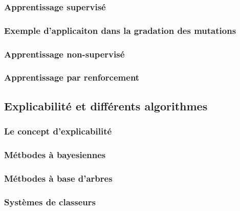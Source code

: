 \subsubsection{Apprentissage supervisé}
\subsubsection{Exemple d'applicaiton dans la gradation des mutations}
\subsubsection{Apprentissage non-supervisé}
\subsubsection{Apprentissage par renforcement}
\subsection{Explicabilité et différents algorithmes}
\subsubsection{Le concept d'explicabilité}
\subsubsection{Métbodes à bayesiennes}
\subsubsection{Métbodes à base d'arbres}
\subsubsection{Systèmes de classeurs}